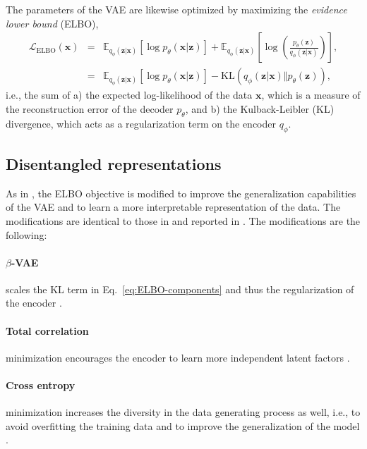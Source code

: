 \documentclass[english,a4paper,10pt]{scrartcl}
\begin{document}
The parameters of the VAE are likewise optimized by maximizing the \emph{evidence lower bound} (ELBO),
\begin{subequations}
    \begin{eqnarray}
        \mathcal{L}_{\mathrm{ELBO}}(\mathbf{x}) & = & \mathbb{E}_{q_{\phi}(\mathbf{z}|\mathbf{x})}\left[\log p_{\theta}(\mathbf{x}|\mathbf{z})\right] + \mathbb{E}_{q_{\phi}(\mathbf{z}|\mathbf{x})}\left[\log\left(\frac{p_{\theta}(\mathbf{z})}{q_{\phi}(\mathbf{z}|\mathbf{x})}\right)\right],\\
        & = & \mathbb{E}_{q_{\phi}(\mathbf{z}|\mathbf{x})}\left[\log p_{\theta}(\mathbf{x}|\mathbf{z})\right] - \mathrm{KL}\left(q_{\phi}(\mathbf{z}|\mathbf{x})\Vert p_{\theta}(\mathbf{z})\right),\label{eq:ELBO-components}
    \end{eqnarray}
\end{subequations}
i.e., the sum of a) the expected log-likelihood of the data $\mathbf{x}$, which is a measure of the reconstruction error of the decoder $p_\theta$, and b) the Kulback-Leibler (KL) divergence, which acts as a regularization term on the encoder $q_\phi$.

\subsection{Disentangled representations}

As in \cite{Groth.precip-predict.2023}, the ELBO objective is modified to improve the generalization capabilities of the VAE and to learn a more interpretable representation of the data. The modifications are identical to those in \cite{Groth.Chavez.2023} and reported in \cite{Groth.precip-predict.2023}. The modifications are the following:

\paragraph{$\beta$-VAE}
scales the KL term in Eq.~\eqref{eq:ELBO-components} and thus the regularization of the encoder \citep{Higgins.Matthey.ea.2017}.

\paragraph{Total correlation}
minimization encourages the encoder to learn more independent latent factors \citep{Chen.Li.ea.2018}.

\paragraph{Cross entropy}
minimization increases the diversity in the data generating process as well, i.e., to avoid overfitting the training data and to improve the generalization of the model \citep{Radford.Kim.ea.2021}.
\end{document}
